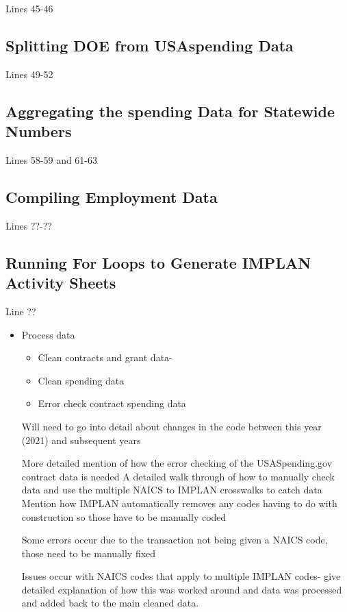 \documentclass[
]{book}
\providecommand{\tightlist}{%
  \setlength{\itemsep}{0pt}\setlength{\parskip}{0pt}}
\begin{document}
Lines 45-46

\hypertarget{splitting-doe-from-usaspending-data}{%
\subsection{Splitting DOE from USAspending Data}\label{splitting-doe-from-usaspending-data}}

Lines 49-52

\hypertarget{aggregating-the-spending-data-for-statewide-numbers}{%
\subsection{Aggregating the spending Data for Statewide Numbers}\label{aggregating-the-spending-data-for-statewide-numbers}}

Lines 58-59 and 61-63

\hypertarget{compiling-employment-data}{%
\subsection{Compiling Employment Data}\label{compiling-employment-data}}

Lines ??-??

\hypertarget{running-for-loops-to-generate-implan-activity-sheets}{%
\subsection{Running For Loops to Generate IMPLAN Activity Sheets}\label{running-for-loops-to-generate-implan-activity-sheets}}

Line ??

\begin{itemize}
\item
  Process data

  \begin{itemize}
  \tightlist
  \item
    Clean contracts and grant data-
  \item
    Clean spending data
  \item
    Error check contract spending data
  \end{itemize}

  Will need to go into detail about changes in the code between this year (2021) and subsequent years

  More detailed mention of how the error checking of the USASpending.gov contract data is needed
  A detailed walk through of how to manually check data and use the multiple NAICS to IMPLAN crosswalks to catch data
  Mention how IMPLAN automatically removes any codes having to do with construction so those have to be manually coded

  Some errors occur due to the transaction not being given a NAICS code, those need to be manually fixed

  Issues occur with NAICS codes that apply to multiple IMPLAN codes- give detailed explanation of how this was worked around and data was processed and added back to the main cleaned data.
\end{itemize}
\end{document}
